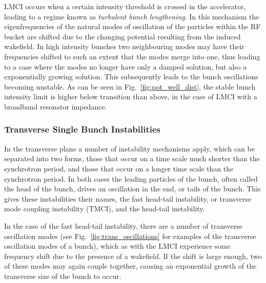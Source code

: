 LMCI occurs when a certain intensity threshold is crossed in the accelerator, leading to a regime known as \emph{turbulent bunch lengthening}. In this mechanism the eigenfrequencies of the natural modes of oscillation of the particles within the RF bucket are shifted due to the changing potential resulting from the induced wakefield. In high intensity bunches two neighbouring modes may have their frequencies shifted to such an extent that the modes merge into one, thus leading to a case where the modes no longer have only a damped solution, but also a exponentially growing solution. This subsequently leads to the bunch oscillations becoming unstable. As can be seen in Fig.~\ref{fig:pot_well_dist}, the stable bunch intensity limit is higher below transition than above, in the case of LMCI with a broadband resonator impedance.

\subsubsection{Transverse Single Bunch Instabilities}

In the transverse plane a number of instability mechanisms apply, which can be separated into two forms, those that occur on a time scale much shorter than the synchrotron period, and those that occur on a longer time scale than the synchrotron period. In both cases the leading particles of the bunch, often called the head of the bunch, drives an oscillation in the end, or tails of the bunch. This gives these instabilities their names, the fast head-tail instability, or transverse mode coupling instability (TMCI), and the head-tail instability.

In the case of the fast head-tail instability, there are a number of transverse oscillation modes (see Fig.~\ref{fig:trans_oscillations} for examples of the transverse oscillation modes of a bunch), which as with the LMCI experience some frequency shift due to the presence of a wakefield. If the shift is large enough, two of these modes may again couple together, causing an exponential growth of the transverse size of the bunch to occur.

